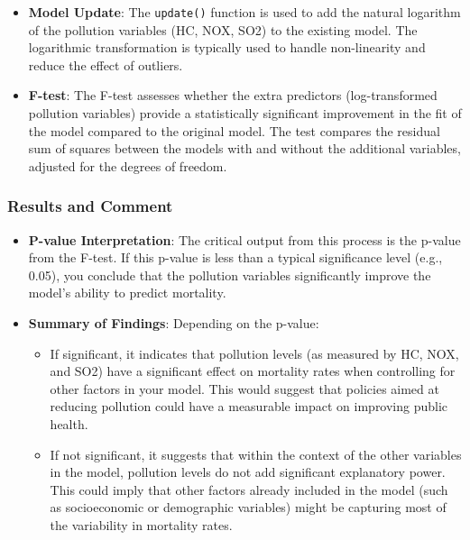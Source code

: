 \documentclass[
]{article}
\providecommand{\tightlist}{%
  \setlength{\itemsep}{0pt}\setlength{\parskip}{0pt}}
\begin{document}
\begin{itemize}
\tightlist
\item
  \textbf{Model Update}: The \texttt{update()} function is used to add
  the natural logarithm of the pollution variables (HC, NOX, SO2) to the
  existing model. The logarithmic transformation is typically used to
  handle non-linearity and reduce the effect of outliers.
\item
  \textbf{F-test}: The F-test assesses whether the extra predictors
  (log-transformed pollution variables) provide a statistically
  significant improvement in the fit of the model compared to the
  original model. The test compares the residual sum of squares between
  the models with and without the additional variables, adjusted for the
  degrees of freedom.
\end{itemize}

\hypertarget{results-and-comment-1}{%
\subsubsection{Results and Comment}\label{results-and-comment-1}}

\begin{itemize}
\tightlist
\item
  \textbf{P-value Interpretation}: The critical output from this process
  is the p-value from the F-test. If this p-value is less than a typical
  significance level (e.g., 0.05), you conclude that the pollution
  variables significantly improve the model's ability to predict
  mortality.
\item
  \textbf{Summary of Findings}: Depending on the p-value:

  \begin{itemize}
  \tightlist
  \item
    If significant, it indicates that pollution levels (as measured by
    HC, NOX, and SO2) have a significant effect on mortality rates when
    controlling for other factors in your model. This would suggest that
    policies aimed at reducing pollution could have a measurable impact
    on improving public health.
  \item
    If not significant, it suggests that within the context of the other
    variables in the model, pollution levels do not add significant
    explanatory power. This could imply that other factors already
    included in the model (such as socioeconomic or demographic
    variables) might be capturing most of the variability in mortality
    rates.
  \end{itemize}
\end{itemize}
\end{document}
